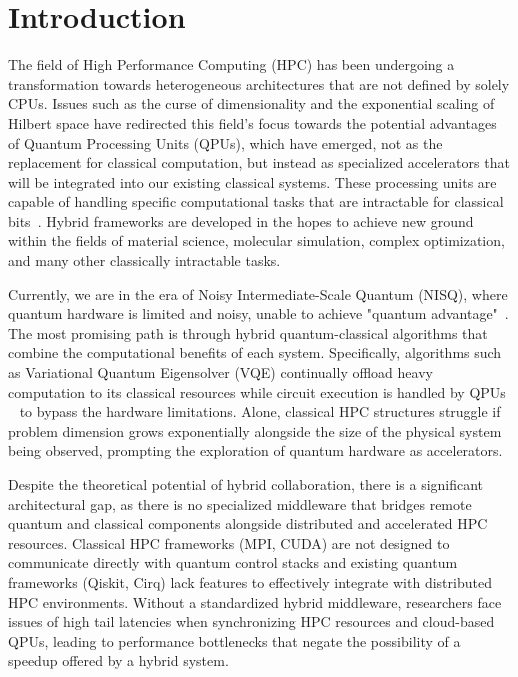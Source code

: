 \section{Introduction}
    The field of High Performance Computing (HPC) has been undergoing a transformation towards heterogeneous architectures 
    that are not defined by solely CPUs. Issues such as the curse of dimensionality and the exponential scaling of Hilbert space have redirected this field's focus 
    towards the potential advantages of Quantum Processing Units (QPUs), which have emerged, not as the replacement for classical computation, but 
    instead as specialized accelerators that will be integrated into our existing classical systems. These processing units are capable of handling 
    specific computational tasks that are intractable for classical bits~\parencite{rallis2025interfacingquantumcomputingsystems}. 
    Hybrid frameworks are developed in the hopes to achieve new ground within the fields of material science, 
    molecular simulation, complex optimization, and many other classically intractable tasks.  

    Currently, we are in the era of Noisy Intermediate-Scale Quantum (NISQ), where quantum hardware is limited and noisy, 
    unable to achieve "quantum advantage"~\parencite{harrow2017quantumsupremacy}. The most promising path 
    is through hybrid quantum-classical algorithms that combine the computational benefits of each system. 
    Specifically, algorithms such as Variational Quantum Eigensolver (VQE) continually offload heavy computation to its classical resources while 
    circuit execution is handled by QPUs ~\parencite{peruzzo2014variational, rallis2025interfacingquantumcomputingsystems} to bypass the hardware limitations. 
    Alone, classical HPC structures struggle if problem dimension grows exponentially alongside 
    the size of the physical system being observed, prompting the exploration of quantum hardware as accelerators. 

    Despite the theoretical potential of hybrid collaboration, there is a significant architectural gap, as  
    there is no specialized middleware that bridges remote quantum and classical components alongside distributed and accelerated HPC resources. Classical HPC frameworks (MPI, CUDA)
    are not designed to communicate directly with quantum control stacks and existing quantum frameworks (Qiskit, Cirq) 
    lack features to effectively integrate with distributed HPC environments. Without a standardized hybrid middleware, researchers face issues of high tail latencies when synchronizing
    HPC resources and cloud-based QPUs, leading to performance bottlenecks that negate the possibility of a speedup offered by a
    hybrid system. 

